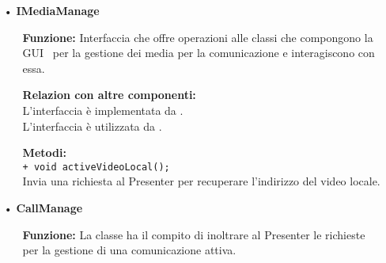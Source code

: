 {\begin{sloppypar}
{\begin{itemize}
\begin{itemize}
			\item[]  \textbf{Relazion con altre componenti:} \\
				L’interfaccia è implementata da .\\
				L’interfaccia è utilizzata da . \\
					
			\item[]  \textbf{Metodi:}\\
				\texttt{+ void searchUser(String type, String user);}\\
				Invia una richiesta al Presenter per cercare e controllare la disponibilità dell’utente 
				desiderato.\\
		\end{itemize}
		
		\item[•] \textbf{IMediaManage}
		\begin{itemize}
			\item[]  \textbf{Funzione:}
				Interfaccia che offre operazioni alle classi che compongono la GUI\g~ per la 
				gestione dei media per la comunicazione e interagiscono con essa.
		
			\item[]  \textbf{Relazion con altre componenti:} \\
				L’interfaccia è implementata da .\\
				L’interfaccia è utilizzata da .\\
					
			\item[]  \textbf{Metodi:}\\
				\texttt{+ void activeVideoLocal();}\\
				Invia una richiesta al Presenter per recuperare l’indirizzo del video locale.\\
	
		\end{itemize}
		
		\item[•] \textbf{CallManage}
		\begin{itemize}
			\item[]  \textbf{Funzione:} La classe ha il compito di inoltrare al Presenter le richieste per la gestione di una comunicazione attiva.
				

\end{itemize}
\end{itemize}}
\end{sloppypar}}
